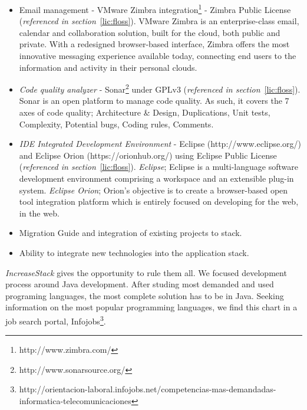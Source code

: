\documentclass[11pt]{scrartcl}
\begin{document}
\begin{itemize}
\begin{itemize}
        \item \emph{Continuous integration} - Jenkins\footnote{http://jenkins-ci.org/} under MIT License (\emph{referenced in section}~\ref{lic:floss}). An extendable open source continuous integration server.
    \end{itemize}
    \item Email management - VMware Zimbra integration\footnote{http://www.zimbra.com/} - Zimbra Public License (\emph{referenced in section}~\ref{lic:floss}). VMware Zimbra is an enterprise-class email, calendar and collaboration solution, built for the cloud, both public and private. With a redesigned browser-based interface, Zimbra offers the most innovative messaging experience available today, connecting end users to the information and activity in their personal clouds.
    \item \emph{Code quality analyzer} - Sonar\footnote{http://www.sonarsource.org/} under GPLv3 (\emph{referenced in section}~\ref{lic:floss}). Sonar is an open platform to manage code quality. As such, it covers the 7 axes of code quality; Architecture \& Design, Duplications, Unit tests, Complexity, Potential bugs, Coding rules, Comments.
    \item \emph{IDE Integrated Development Environment} - Eclipse (http://www.eclipse.org/) and Eclipse Orion (https://orionhub.org/) using Eclipse Public License (\emph{referenced in section}~\ref{lic:floss}). \emph{Eclipse}; Eclipse is a multi-language software development environment comprising a workspace and an extensible plug-in system. \emph{Eclipse Orion}; Orion's objective is to create a browser-based open tool integration platform which is entirely focused on developing for the web, in the web.
    \item Migration Guide and integration of existing projects to stack.
    \item Ability to integrate new technologies into the application stack.
\end{itemize}

\par \emph{IncreaseStack} gives the opportunity to rule them all. We focused development process around Java development. After studing most demanded and used programing languages, the most complete solution has to be in Java. Seeking information on the most popular programming languages​​, we find this chart in a job search portal, Infojobs\footnote{http://orientacion-laboral.infojobs.net/competencias-mas-demandadas-informatica-telecomunicaciones}.
\end{document}
